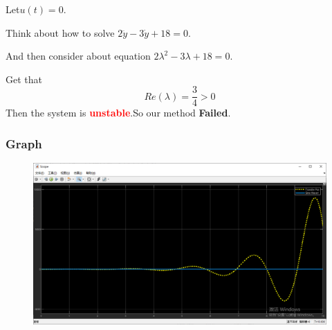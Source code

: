 \documentclass[12pt,a4paper,oneside]{ctexart}
\begin{document}
        Let$u(t) = 0$.

        Think about how to solve $2\ddot{y}-3\dot{y}+18=0$.

        And then consider about equation $2\lambda^2-3\lambda+18=0$.
        
        Get that
        $$Re(\lambda) = \frac{3}{4} > 0$$
        Then the system is \textcolor{red}{\textbf{unstable}}.So our method \textbf{Failed}.
        \subsubsection{Graph}
            \begin{figure}[H]
                \includegraphics[width = 0.9\linewidth]{Q4Non-stableFails}
            \end{figure}
\end{document}

